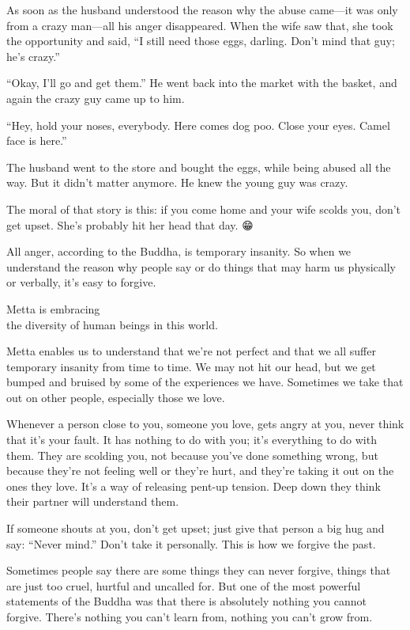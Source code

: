 \documentclass[12pt, openany]{book}
\newenvironment{aphorism}%
{%
\begin{center}\begin{itshape}
}%
{\end{itshape}\end{center}
}%
\begin{document}
As soon as the husband understood the reason why the abuse came—it was only from a crazy man—all his anger disappeared. When the wife saw that, she took the opportunity and said, “I still need those eggs, darling. Don’t mind that guy; he’s crazy.” 

“Okay, I’ll go and get them.” He went back into the market with the basket, and again the crazy guy came up to him. 

“Hey, hold your noses, everybody. Here comes dog poo. Close your eyes. Camel face is here.” 

The husband went to the store and bought the eggs, while being abused all the way. But it didn’t matter anymore. He knew the young guy was crazy. 

The moral of that story is this: if you come home and your wife scolds you, don’t get upset. She’s probably hit her head that day. 😁 

All anger, according to the Buddha, is temporary insanity. So when we understand the reason why people say or do things that may harm us physically or verbally, it’s easy to forgive. 

\begin{aphorism}
Metta is embracing\\  
the diversity of human beings in this world.
\end{aphorism}

Metta enables us to understand that we’re not perfect and that we all suffer temporary insanity from time to time. We may not hit our head, but we get bumped and bruised by some of the experiences we have. Sometimes we take that out on other people, especially those we love. 

Whenever a person close to you, someone you love, gets angry at you, never think that it’s your fault. It has nothing to do with you; it’s everything to do with them. They are scolding you, not because you’ve done something wrong, but because they’re not feeling well or they’re hurt, and they’re taking it out on the ones they love. It’s a way of releasing pent-up tension. Deep down they think their partner will understand them. 

If someone shouts at you, don’t get upset; just give that person a big hug and say: “Never mind.” Don’t take it personally. This is how we forgive the past. 

Sometimes people say there are some things they can never forgive, things that are just too cruel, hurtful and uncalled for. But one of the most powerful statements of the Buddha was that there is absolutely nothing you cannot forgive. There’s nothing you can’t learn from, nothing you can’t grow from. 
\end{document}
